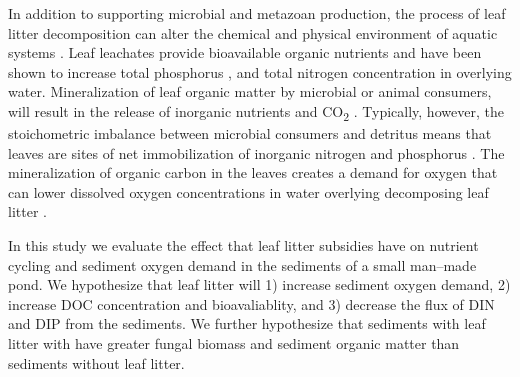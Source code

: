 In addition to supporting microbial and metazoan production, the process of leaf litter decomposition can alter the chemical and physical environment of aquatic systems \cite{Gessner_1999}. Leaf leachates provide bioavailable organic nutrients \cite{McConnell_1968,Duan_2014} and have been shown to increase total phosphorus \cite{Feh_2015b}, and total nitrogen \cite{Feh_2015} concentration in overlying water. Mineralization of leaf organic matter by microbial or animal consumers, will result in the release of inorganic nutrients and CO\textsubscript{2} \cite{CITE}. Typically, however, the stoichometric imbalance between microbial consumers and detritus means that leaves are sites of net immobilization of inorganic nitrogen and phosphorus \cite{CITE}. The mineralization of organic carbon in the leaves creates a demand for oxygen \cite{CITE} that can lower dissolved oxygen concentrations in water overlying decomposing leaf litter \cite{Hodkinson_1975,Rubbo_2008,Mehring_2014,Feh_2015b}.

In this study we evaluate the effect that leaf litter subsidies have on nutrient cycling and sediment oxygen demand in the sediments of a small man--made pond. We hypothesize that leaf litter will 1) increase sediment oxygen demand, 2) increase DOC concentration and bioavaliablity, and 3) decrease the flux of DIN and DIP from the sediments. We further hypothesize that sediments with leaf litter with have greater fungal biomass and sediment organic matter than sediments without leaf litter.